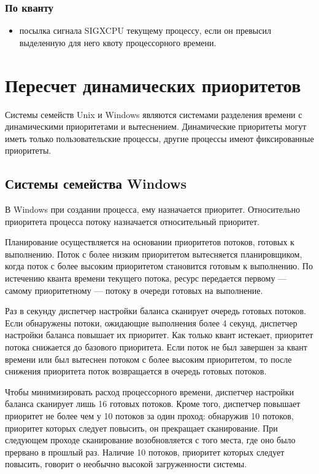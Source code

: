 \subsection*{По кванту}

\begin{itemize}
	\item посылка сигнала SIGXCPU текущему процессу, если он превысил выделенную для него квоту процессорного времени.
\end{itemize}

\clearpage



\chapter{Пересчет динамических приоритетов}

Системы семейств Unix и Windows являются системами разделения времени с динамическими приоритетами и вытеснением. Динамические приоритеты могут иметь только пользовательские процессы, другие процессы имеют фиксированные приоритеты.

\section{Системы семейства Windows}

В Windows при создании процесса, ему назначается приоритет. Относительно приоритета процесса потоку назначается относительный приоритет.

Планирование осуществляется на основании приоритетов потоков, готовых к выполнению. Поток с более низким приоритетом вытесняется планировщиком, когда поток с более высоким приоритетом становится готовым к выполнению. По истечению кванта времени текущего потока, ресурс передается первому --- самому приоритетному --- потоку в очереди готовых на выполнение.

Раз в секунду диспетчер настройки баланса сканирует очередь готовых потоков. Если обнаружены потоки, ожидающие выполнения более 4 секунд, диспетчер настройки баланса повышает их приоритет. Как только квант истекает, приоритет потока снижается до базового приоритета. Если поток не был завершен за квант времени или был вытеснен потоком с более высоким приоритетом, то после снижения приоритета поток возвращается в очередь готовых потоков.

Чтобы минимизировать расход процессорного времени, диспетчер настройки баланса сканирует лишь 16 готовых потоков. Кроме того, диспетчер повышает приоритет не более чем у 10 потоков за один проход: обнаружив 10 потоков, приоритет которых следует повысить, он прекращает сканирование. При следующем проходе сканирование возобновляется с того места, где оно было прервано в прошлый раз. Наличие 10 потоков, приоритет которых следует повысить, говорит о необычно высокой загруженности системы.

